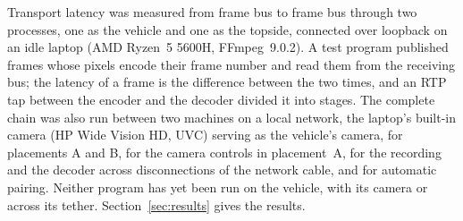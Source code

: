 Transport latency was measured from frame bus to frame bus through
two \hellion{}
processes, one as the vehicle and one as the topside, connected over
loopback on an
idle laptop (AMD Ryzen~5 5600H, FFmpeg~9.0.2). A test program
published frames whose
pixels encode their frame number and read them from the receiving
bus; the latency of a
frame is the difference between the two times, and an RTP tap between
the encoder and
the decoder divided it into stages. The complete chain was
also run between two machines on a local network, the laptop's
built-in camera (HP
Wide Vision HD, UVC) serving as the vehicle's camera, for placements
A and B, for the
camera controls in placement~A, for the recording and the decoder
across disconnections
of the network cable, and for automatic pairing. Neither program has
yet been run on the
vehicle, with its camera or across its tether.
Section~\ref{sec:results} gives the results.
